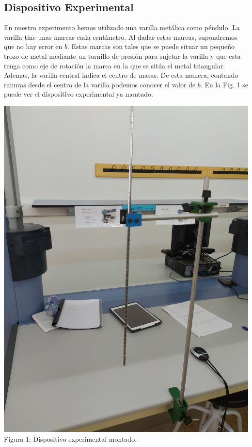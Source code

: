 \documentclass{article}
\begin{document}
\begin{multicols}{2}
\section*{Dispositivo Experimental}
En nuestro experimento hemos utilizado una varilla metálica como péndulo. La varilla tine unas marcas cada centímetro. Al dadas estas marcas, supondremos que no hay error en $b$. Estas marcas son tales que se puede situar un pequeño trozo de metal mediante un tornillo de presión para sujetar la varilla y que esta tenga como eje de rotación la marca en la que se sitúa el metal triangular. Ademas, la varilla central indica el centro de masas. De esta manera, contando ranuras desde el centro de la varilla podemos conocer el valor de $b$. En la Fig. 1 se puede ver el dispositivo experimental ya montado.
\begin{center}
    \includegraphics[scale=0.06, angle=-90]{figures/c2.png}\\
    Figura 1: Dispositivo experimental montado.
\end{center}


\end{multicols}
\end{document}
